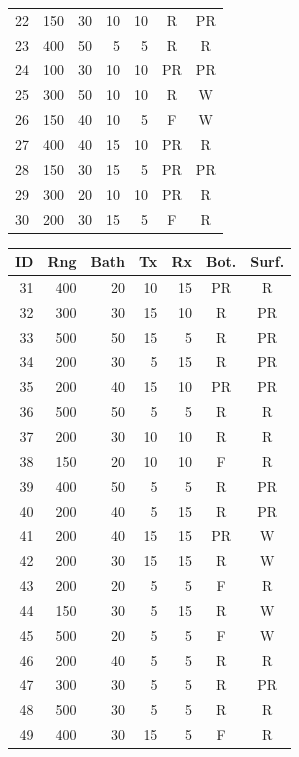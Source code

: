 \documentclass{wileysev}
\begin{document}
\begin{table}[H]
\begin{minipage}[t]{0.49\textwidth}
\begin{tabular}{@{}rrrrrcc@{}}
				22 & 150 & 30 & 10 & 10 & R & PR \\
				23 & 400 & 50 & 5 & 5 & R & R \\
				24 & 100 & 30 & 10 & 10 & PR & PR \\
				25 & 300 & 50 & 10 & 10 & R & W \\
				26 & 150 & 40 & 10 & 5 & F & W \\
				27 & 400 & 40 & 15 & 10 & PR & R \\
				28 & 150 & 30 & 15 & 5 & PR & PR \\
				29 & 300 & 20 & 10 & 10 & PR & R \\
				30 & 200 & 30 & 15 & 5 & F & R \\
				\bottomrule
			\end{tabular}
		\end{minipage}\hfill
		\begin{minipage}[t]{0.49\textwidth}
			\vspace{0pt}
			\centering
			\begin{tabular}{@{}rrrrrcc@{}}
				\toprule
				ID & Rng & Bath & Tx & Rx & Bot. & Surf. \\
				\midrule
				31 & 400 & 20 & 10 & 15 & PR & R \\
				32 & 300 & 30 & 15 & 10 & R & PR \\
				33 & 500 & 50 & 15 & 5 & R & PR \\
				34 & 200 & 30 & 5 & 15 & R & PR \\
				35 & 200 & 40 & 15 & 10 & PR & PR \\
				36 & 500 & 50 & 5 & 5 & R & R \\
				37 & 200 & 30 & 10 & 10 & R & R \\
				38 & 150 & 20 & 10 & 10 & F & R \\
				39 & 400 & 50 & 5 & 5 & R & PR \\
				40 & 200 & 40 & 5 & 15 & R & PR \\
				41 & 200 & 40 & 15 & 15 & PR & W \\
				42 & 200 & 30 & 15 & 15 & R & W \\
				43 & 200 & 20 & 5 & 5 & F & R \\
				44 & 150 & 30 & 5 & 15 & R & W \\
				45 & 500 & 20 & 5 & 5 & F & W \\
				46 & 200 & 40 & 5 & 5 & R & R \\
				47 & 300 & 30 & 5 & 5 & R & PR \\
				48 & 500 & 30 & 5 & 5 & R & R \\
				49 & 400 & 30 & 15 & 5 & F & R \\

\end{tabular}
\end{minipage}
\end{table}
\end{document}
